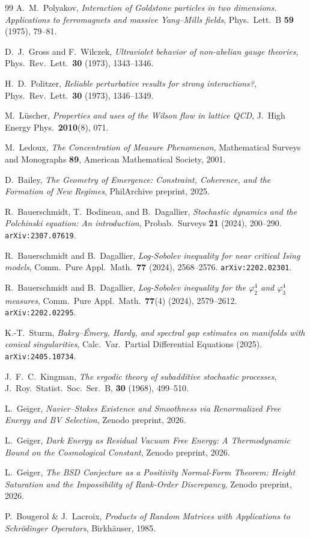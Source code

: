 \documentclass[12pt,a4paper]{article}
\theoremstyle{definition}
\theoremstyle{plain}
\theoremstyle{remark}
\begin{document}
\begin{thebibliography}{99}
A.~M.~Polyakov, \emph{Interaction of Goldstone particles in two dimensions.
Applications to ferromagnets and massive Yang--Mills fields},
Phys.\ Lett.\ B \textbf{59} (1975), 79--81.

D.~J.~Gross and F.~Wilczek, \emph{Ultraviolet behavior of non-abelian gauge theories},
Phys.\ Rev.\ Lett.\ \textbf{30} (1973), 1343--1346.

H.~D.~Politzer, \emph{Reliable perturbative results for strong interactions?},
Phys.\ Rev.\ Lett.\ \textbf{30} (1973), 1346--1349.

M.~L\"uscher, \emph{Properties and uses of the Wilson flow in lattice QCD},
J.\ High Energy Phys.\ \textbf{2010}(8), 071.

M.~Ledoux, \emph{The Concentration of Measure Phenomenon},
Mathematical Surveys and Monographs \textbf{89}, American Mathematical Society, 2001.

D.~Bailey, \emph{The Geometry of Emergence: Constraint, Coherence, and the Formation of New Regimes}, PhilArchive preprint, 2025.

R.~Bauerschmidt, T.~Bodineau, and B.~Dagallier, \emph{Stochastic dynamics and the Polchinski equation: An introduction}, Probab.\ Surveys \textbf{21} (2024), 200--290. \texttt{arXiv:2307.07619}.

R.~Bauerschmidt and B.~Dagallier, \emph{Log-Sobolev inequality for near critical Ising models}, Comm.\ Pure Appl.\ Math.\ \textbf{77} (2024), 2568--2576. \texttt{arXiv:2202.02301}.

R.~Bauerschmidt and B.~Dagallier, \emph{Log-Sobolev inequality for the $\varphi^4_2$ and $\varphi^4_3$ measures}, Comm.\ Pure Appl.\ Math.\ \textbf{77}(4) (2024), 2579--2612. \texttt{arXiv:2202.02295}.

K.-T.~Sturm, \emph{Bakry--\'Emery, Hardy, and spectral gap estimates on manifolds with conical singularities}, Calc.\ Var.\ Partial Differential Equations (2025). \texttt{arXiv:2405.10734}.

J.~F.~C.~Kingman, \textit{The ergodic theory of subadditive stochastic processes}, J.~Roy.\ Statist.\ Soc.\ Ser.~B, \textbf{30} (1968), 499--510.

L.~Geiger, \emph{Navier--Stokes Existence and Smoothness via Renormalized Free Energy and BV Selection}, Zenodo preprint, 2026.

L.~Geiger, \emph{Dark Energy as Residual Vacuum Free Energy: A Thermodynamic Bound on the Cosmological Constant}, Zenodo preprint, 2026.

L.~Geiger, \emph{The BSD Conjecture as a Positivity Normal-Form Theorem: Height Saturation and the Impossibility of Rank-Order Discrepancy}, Zenodo preprint, 2026.

P.~Bougerol \& J.~Lacroix, \emph{Products of Random Matrices with Applications to Schr\"odinger Operators}, Birkh\"auser, 1985.

\end{thebibliography}
\end{document}
